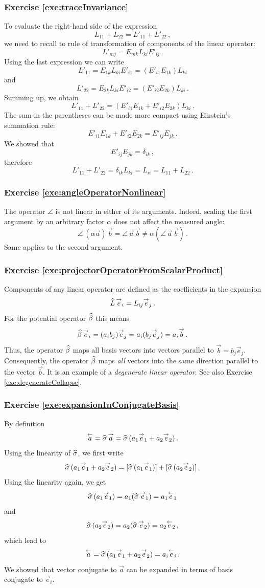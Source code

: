 \subsubsection*{Exercise \ref{exe:traceInvariance}}
To evaluate the right-hand side of the expression
\[
L_{11} +L_{22} = L'_{11} + L'_{22}\,,
\]
we need to recall to rule of transformation of components of the
linear operator:
\[
L'_{mj} = E_{mk}L_{ki}E'_{ij}\,.
\]
Using the last expression we can write
\[
L'_{11} = E_{1k}L_{ki}E'_{i1} = (E'_{i1}E_{1k}) L_{ki}
\]
and
\[
L'_{22} = E_{2k}L_{ki}E'_{i2} = (E'_{i2}E_{2k}) L_{ki}\,.
\]
Summing up, we obtain
\[
L'_{11} + L'_{22} = \left(E'_{i1}E_{1k} +E'_{i2}E_{2k} \right)L_{ki}\,.
\]
The sum in the parentheses can be made more compact using Einstein's summation
rule:
\[
E'_{i1}E_{1k} +E'_{i2}E_{2k} = E'_{ij}E_{jk}\,.
\]
We showed that
\[
E'_{ij}E_{jk} = \delta_{ik}\,,
\]
therefore
\[
L'_{11} + L'_{22} = \delta_{ik}L_{ki}=L_{ii} = L_{11}+L_{22}\,.
\]

\subsubsection*{Exercise \ref{exe:angleOperatorNonlinear}}
The operator $\angle$ is not linear in either of its
arguments. Indeed, scaling the first argument by an arbitrary factor
$\alpha$ does not affect the measured angle:
\[
\angle\,(\alpha \vec{a})\,\vec{b} = \angle\, \vec{a}\,\vec{b} \ne
\alpha (\angle\, \vec{a}\,\vec{b})\,.
\]
Same applies to the second argument.

\subsubsection*{Exercise \ref{exe:projectorOperatorFromScalarProduct}}
Components of any linear operator are defined as the coefficients in
the expansion
\[
\widehat{L}\,\overset{\rightarrow}{e}_i = L_{ij}\overset{\rightarrow}{e}_j\,.
\]
For the potential operator $\widehat{\beta}$ this means
\[
\widehat{\beta}\,\overset{\rightarrow}{e}_i = (a_ib_j)\overset{\rightarrow}{e}_j = a_i(b_j\overset{\rightarrow}{e}_j) = a_i\overset{\rightarrow}{b}\,.
\]
Thus, the operator $\widehat{\beta}$ maps all basis vectors into vectors
parallel to $\vec{b} = b_j\vec{e}_j$. Consequently, the operator
$\widehat{\beta}$ maps \emph{all} vectors into the same direction parallel
to the vector $\vec{b}$. It is an example of a \emph{degenerate linear
operator}. See also {Exercise \ref{exe:degenerateCollapse}}.


\subsubsection*{Exercise \ref{exe:expansionInConjugateBasis}}
By definition
\[
\overset{\leftarrow}{a} = \widehat{\sigma}\,\overset{\rightarrow}{a} = \widehat{\sigma}\,(a_1\overset{\rightarrow}{e}_1+a_2\overset{\rightarrow}{e}_2)\,.
\]
Using the linearity of $\widehat{\sigma}$, we first write
\[
\widehat{\sigma}\,(a_1\overset{\rightarrow}{e}_1+a_2\overset{\rightarrow}{e}_2) =
\lbrack\widehat{\sigma}\,(a_1\overset{\rightarrow}{e}_1)\rbrack +
\lbrack\widehat{\sigma}\,(a_2\overset{\rightarrow}{e}_2)\rbrack\,.
\]
Using the linearity again, we get
\[
\widehat{\sigma}\,(a_1\overset{\rightarrow}{e}_1)=a_1(\widehat{\sigma}\,\overset{\rightarrow}{e}_1) = a_1\overset{\leftarrow}{e}_1
\]
and
\[
\widehat{\sigma}\,(a_2\overset{\rightarrow}{e}_2)=a_2(\widehat{\sigma}\,\overset{\rightarrow}{e}_2)=a_2\overset{\leftarrow}{e}_2\,,
\]
which lead to
\[
\overset{\leftarrow}{a}=\widehat{\sigma}\,(a_1\overset{\rightarrow}{e}_1+a_2\overset{\rightarrow}{e}_2) = a_i\overset{\leftarrow}{e}_i\,.
\]
We showed that vector conjugate to $\vec{a}$ can be expanded in terms
of basis conjugate to $\vec{e}_i$.

